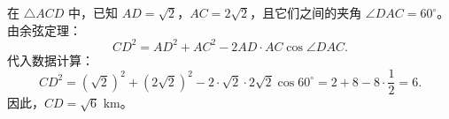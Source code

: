 {  在 \(\triangle ACD\) 中，已知 \(AD = \sqrt{2}\)，\(AC = 2\sqrt{2}\)，且它们之间的夹角 \(\angle DAC = 60^\circ\)。
  由余弦定理：
  \[
    CD^2 = AD^2 + AC^2 - 2 AD \cdot AC \cos\angle DAC.
  \]
  代入数据计算：
  \[
    CD^2 = (\sqrt{2})^2 + (2\sqrt{2})^2 - 2 \cdot \sqrt{2} \cdot 2\sqrt{2} \cos 60^\circ = 2 + 8 - 8 \cdot \frac{1}{2} = 6.
  \]
  因此，\(CD = \sqrt{6}\text{ km}\)。
}

\newcommand{\qTJWTriangleLakeMeasurementStem}{\qTriangleLakeMeasurementStem}
\newcommand{\qTJWTriangleLakeMeasurementAnswer}{\qTriangleLakeMeasurementAnswer}
\newcommand{\qTJWTriangleLakeMeasurementFigure}{\qTriangleLakeMeasurementFigure}
\newcommand{\qTJWTriangleLakeMeasurementSolution}{\qTriangleLakeMeasurementSolution}
